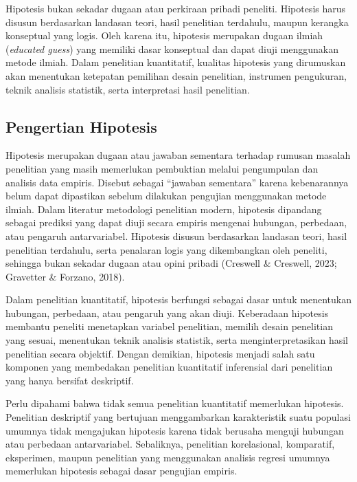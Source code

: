 \documentclass[
  indonesian,
  letterpaper,
  DIV=11,
  numbers=noendperiod]{scrreprt}
\begin{document}
Hipotesis bukan sekadar dugaan atau perkiraan pribadi peneliti.
Hipotesis harus disusun berdasarkan landasan teori, hasil penelitian
terdahulu, maupun kerangka konseptual yang logis. Oleh karena itu,
hipotesis merupakan dugaan ilmiah (\emph{educated guess}) yang memiliki
dasar konseptual dan dapat diuji menggunakan metode ilmiah. Dalam
penelitian kuantitatif, kualitas hipotesis yang dirumuskan akan
menentukan ketepatan pemilihan desain penelitian, instrumen pengukuran,
teknik analisis statistik, serta interpretasi hasil penelitian.

\subsection{Pengertian Hipotesis}\label{pengertian-hipotesis}

Hipotesis merupakan dugaan atau jawaban sementara terhadap rumusan
masalah penelitian yang masih memerlukan pembuktian melalui pengumpulan
dan analisis data empiris. Disebut sebagai ``jawaban sementara'' karena
kebenarannya belum dapat dipastikan sebelum dilakukan pengujian
menggunakan metode ilmiah. Dalam literatur metodologi penelitian modern,
hipotesis dipandang sebagai prediksi yang dapat diuji secara empiris
mengenai hubungan, perbedaan, atau pengaruh antarvariabel. Hipotesis
disusun berdasarkan landasan teori, hasil penelitian terdahulu, serta
penalaran logis yang dikembangkan oleh peneliti, sehingga bukan sekadar
dugaan atau opini pribadi (Creswell \& Creswell, 2023; Gravetter \&
Forzano, 2018).

Dalam penelitian kuantitatif, hipotesis berfungsi sebagai dasar untuk
menentukan hubungan, perbedaan, atau pengaruh yang akan diuji.
Keberadaan hipotesis membantu peneliti menetapkan variabel penelitian,
memilih desain penelitian yang sesuai, menentukan teknik analisis
statistik, serta menginterpretasikan hasil penelitian secara objektif.
Dengan demikian, hipotesis menjadi salah satu komponen yang membedakan
penelitian kuantitatif inferensial dari penelitian yang hanya bersifat
deskriptif.

Perlu dipahami bahwa tidak semua penelitian kuantitatif memerlukan
hipotesis. Penelitian deskriptif yang bertujuan menggambarkan
karakteristik suatu populasi umumnya tidak mengajukan hipotesis karena
tidak berusaha menguji hubungan atau perbedaan antarvariabel.
Sebaliknya, penelitian korelasional, komparatif, eksperimen, maupun
penelitian yang menggunakan analisis regresi umumnya memerlukan
hipotesis sebagai dasar pengujian empiris.
\end{document}
